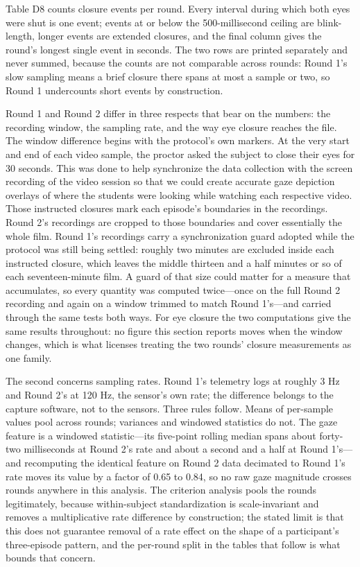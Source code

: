 % 
% 

Table D8 counts closure events per round. Every interval during which both eyes were shut is
one event; events at or below the 500-millisecond ceiling are blink-length, longer events
are extended closures, and the final column gives the round's longest single event in
seconds. The two rows are printed separately and never summed, because the counts are not
comparable across rounds: Round 1's slow sampling means a brief closure there spans at most
a sample or two, so Round 1 undercounts short events by construction.

% 

Round 1 and Round 2 differ in three respects that bear on the numbers: the recording window,
the sampling rate, and the way eye closure reaches the file. The window difference begins
with the protocol's own markers. At the very start and end of each video sample, the proctor
asked the subject to close their eyes for 30 seconds. This was done to help synchronize the
data collection with the screen recording of the video session so that we could create
accurate gaze depiction overlays of where the students were looking while watching each
respective video. Those instructed closures mark each episode's boundaries in the recordings.
Round 2's recordings are cropped to those boundaries and cover essentially the whole film. Round 1's recordings carry a synchronization guard adopted while
the protocol was still being settled: roughly two minutes are excluded inside each instructed
closure, which leaves the middle thirteen and a half minutes or so of each seventeen-minute
film. A guard of that size could matter for a measure that accumulates, so every quantity was
computed twice---once on the full Round 2 recording and again on a window trimmed to match
Round 1's---and carried through the same tests both ways. For eye closure the two
computations give the same results throughout: no figure this section reports moves when the
window changes, which is what licenses treating the two rounds' closure measurements as one
family.

The second concerns sampling rates. Round 1's telemetry logs at roughly 3 Hz and Round 2's at
120 Hz, the sensor's own rate; the difference belongs to the capture software, not to the
sensors. Three rules follow. Means of per-sample values pool across rounds; variances and
windowed statistics do not. The gaze feature is a windowed statistic---its five-point rolling
median spans about forty-two milliseconds at Round 2's rate and about a second and a half at
Round 1's---and recomputing the identical feature on Round 2 data decimated to Round 1's rate
moves its value by a factor of 0.65 to 0.84, so no raw gaze magnitude crosses rounds anywhere
in this analysis. The criterion analysis pools the rounds legitimately, because
within-subject standardization is scale-invariant and removes a multiplicative rate
difference by construction; the stated limit is that this does not guarantee removal of a
rate effect on the shape of a participant's three-episode pattern, and the per-round split in
the tables that follow is what bounds that concern.

